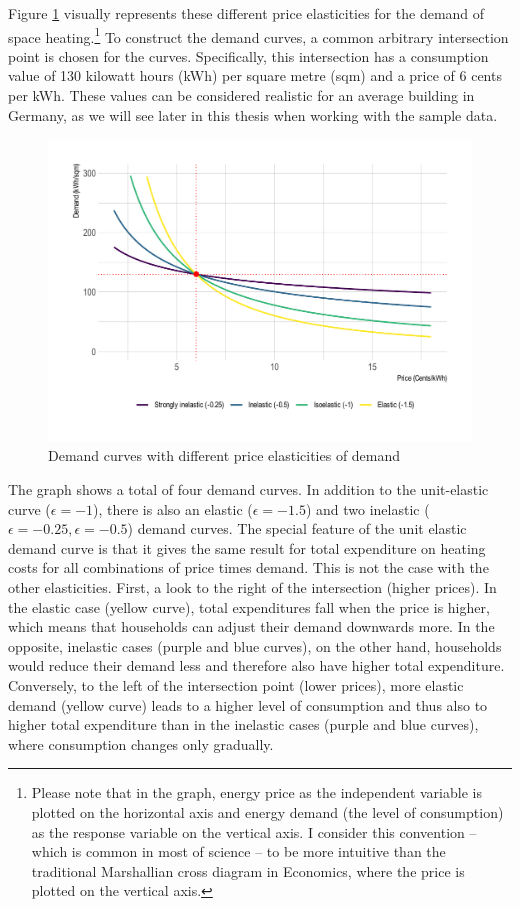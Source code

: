 \documentclass[12pt,twoside]{reedthesis}
\begin{document}
Figure \ref{fig:elasticities-conceptual} visually represents these different price elasticities for the demand of space heating.\footnote{Please note that in the graph, energy price as the independent variable is plotted on the horizontal axis and energy demand (the level of consumption) as the response variable on the vertical axis. I consider this convention -- which is common in most of science -- to be more intuitive than the traditional Marshallian cross diagram in Economics, where the price is plotted on the vertical axis.} To construct the demand curves, a common arbitrary intersection point is chosen for the curves. Specifically, this intersection has a consumption value of 130 kilowatt hours (kWh) per square metre (sqm) and a price of 6 cents per kWh. These values can be considered realistic for an average building in Germany, as we will see later in this thesis when working with the sample data.
\begin{figure}

{\centering \includegraphics[width=1\linewidth]{figure/elasticities_plot} 

}

\caption{Demand curves with different price elasticities of demand}\label{fig:elasticities-conceptual}
\end{figure}
The graph shows a total of four demand curves. In addition to the unit-elastic curve (\(\epsilon = -1\)), there is also an elastic (\(\epsilon = -1.5\)) and two inelastic (\(\epsilon = -0.25, \epsilon = -0.5\)) demand curves. The special feature of the unit elastic demand curve is that it gives the same result for total expenditure on heating costs for all combinations of price times demand. This is not the case with the other elasticities. First, a look to the right of the intersection (higher prices). In the elastic case (yellow curve), total expenditures fall when the price is higher, which means that households can adjust their demand downwards more. In the opposite, inelastic cases (purple and blue curves), on the other hand, households would reduce their demand less and therefore also have higher total expenditure. Conversely, to the left of the intersection point (lower prices), more elastic demand (yellow curve) leads to a higher level of consumption and thus also to higher total expenditure than in the inelastic cases (purple and blue curves), where consumption changes only gradually.
\end{document}
